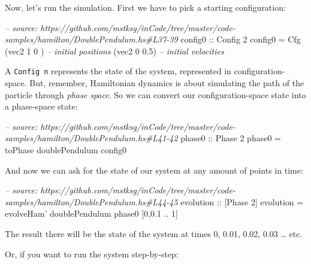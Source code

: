 \documentclass[]{article}
\newenvironment{Shaded}{}{}
\newcommand{\DataTypeTok}[1]{\textcolor[rgb]{0.56,0.13,0.00}{#1}}
\newcommand{\DecValTok}[1]{\textcolor[rgb]{0.25,0.63,0.44}{#1}}
\newcommand{\FloatTok}[1]{\textcolor[rgb]{0.25,0.63,0.44}{#1}}
\newcommand{\CommentTok}[1]{\textcolor[rgb]{0.38,0.63,0.69}{\textit{#1}}}
\newcommand{\OtherTok}[1]{\textcolor[rgb]{0.00,0.44,0.13}{#1}}
\newcommand{\FunctionTok}[1]{\textcolor[rgb]{0.02,0.16,0.49}{#1}}
\newcommand{\NormalTok}[1]{#1}
\begin{document}
Now, let's run the simulation. First we have to pick a starting configuration:

\begin{Shaded}
\begin{Highlighting}[]
\CommentTok{-- source: https://github.com/mstksg/inCode/tree/master/code-samples/hamilton/DoublePendulum.hs#L37-39}
\OtherTok{config0 ::} \DataTypeTok{Config} \DecValTok{2}
\NormalTok{config0 }\FunctionTok{=} \DataTypeTok{Cfg}\NormalTok{ (vec2 }\DecValTok{1} \DecValTok{0}\NormalTok{  )  }\CommentTok{-- initial positions}
\NormalTok{              (vec2 }\DecValTok{0} \FloatTok{0.5}\NormalTok{)  }\CommentTok{-- initial velocities}
\end{Highlighting}
\end{Shaded}

A \texttt{Config\ n} represents the state of the system, represented in
configuration-space. But, remember, Hamiltonian dynamics is about simulating the
path of the particle through \emph{phase space}. So we can convert our
configuration-space state into a phase-space state:

\begin{Shaded}
\begin{Highlighting}[]
\CommentTok{-- source: https://github.com/mstksg/inCode/tree/master/code-samples/hamilton/DoublePendulum.hs#L41-42}
\OtherTok{phase0 ::} \DataTypeTok{Phase} \DecValTok{2}
\NormalTok{phase0 }\FunctionTok{=}\NormalTok{ toPhase doublePendulum config0}
\end{Highlighting}
\end{Shaded}

And now we can ask for the state of our system at any amount of points in time:

\begin{Shaded}
\begin{Highlighting}[]
\CommentTok{-- source: https://github.com/mstksg/inCode/tree/master/code-samples/hamilton/DoublePendulum.hs#L44-45}
\OtherTok{evolution ::}\NormalTok{ [}\DataTypeTok{Phase} \DecValTok{2}\NormalTok{]}
\NormalTok{evolution }\FunctionTok{=}\NormalTok{ evolveHam' doublePendulum phase0 [}\DecValTok{0}\NormalTok{,}\FloatTok{0.1} \FunctionTok{..} \DecValTok{1}\NormalTok{]}
\end{Highlighting}
\end{Shaded}

The result there will be the state of the system at times 0, 0.01, 0.02, 0.03
\ldots{} etc.

Or, if you want to run the system step-by-step:
\end{document}
